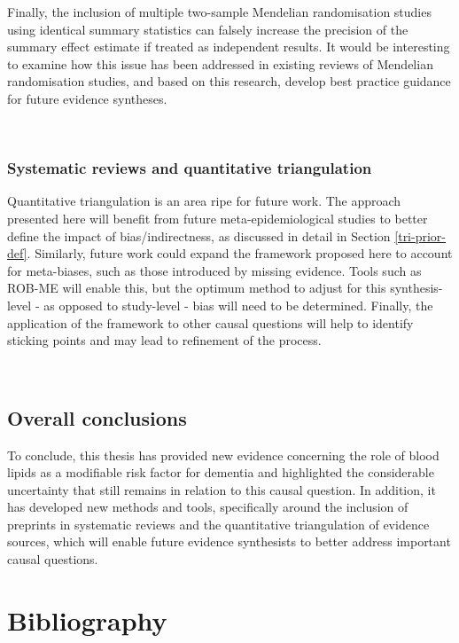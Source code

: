 \documentclass[a4paper, twoside]{templates/ociamthesis}
\begin{document}
Finally, the inclusion of multiple two-sample Mendelian randomisation studies using identical summary statistics can falsely increase the precision of the summary effect estimate if treated as independent results. It would be interesting to examine how this issue has been addressed in existing reviews of Mendelian randomisation studies, and based on this research, develop best practice guidance for future evidence syntheses.

~

\hypertarget{systematic-reviews-and-quantitative-triangulation}{%
\subsection{Systematic reviews and quantitative triangulation}\label{systematic-reviews-and-quantitative-triangulation}}

Quantitative triangulation is an area ripe for future work. The approach presented here will benefit from future meta-epidemiological studies to better define the impact of bias/indirectness, as discussed in detail in Section \ref{tri-prior-def}. Similarly, future work could expand the framework proposed here to account for meta-biases, such as those introduced by missing evidence. Tools such as ROB-ME will enable this, but the optimum method to adjust for this synthesis-level - as opposed to study-level - bias will need to be determined. Finally, the application of the framework to other causal questions will help to identify sticking points and may lead to refinement of the process.

~

\hypertarget{overall-conclusions}{%
\section{Overall conclusions}\label{overall-conclusions}}

To conclude, this thesis has provided new evidence concerning the role of blood lipids as a modifiable risk factor for dementia and highlighted the considerable uncertainty that still remains in relation to this causal question. In addition, it has developed new methods and tools, specifically around the inclusion of preprints in systematic reviews and the quantitative triangulation of evidence sources, which will enable future evidence synthesists to better address important causal questions.

\hypertarget{bibliography}{%
\chapter{Bibliography}\label{bibliography}}
\end{document}
